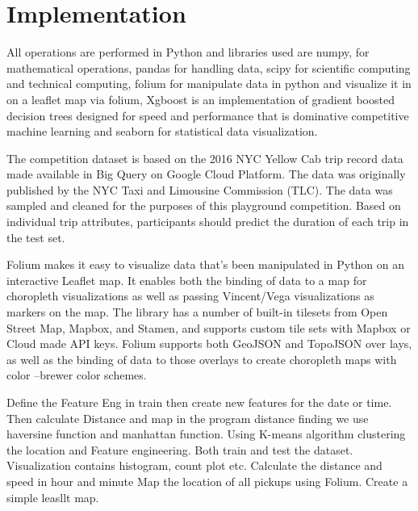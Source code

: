 \documentclass[12pt,report]{ucdavisthesis}
\begin{document}
             \section{Implementation}
        \hspace{2cm}All operations are performed in Python and libraries used are numpy, for
        mathematical operations, pandas for handling data, scipy for scientific computing
        and technical computing, folium for manipulate data in python and
        visualize it in on a leaflet map via folium, Xgboost is an implementation of
        gradient boosted decision trees designed for speed and performance that is
        dominative competitive machine learning and seaborn for statistical data
        visualization.\par\hspace{2cm} The competition dataset is based on the 2016 NYC Yellow Cab trip record
        data made available in Big Query on Google Cloud Platform. The data was
        originally published by the NYC Taxi and Limousine Commission (TLC). The
        data was sampled and cleaned for the purposes of this playground competition.
        Based on individual trip attributes, participants should predict the duration of
        each trip in the test set.
        \par\hspace{2cm}Folium makes it easy to visualize data that’s been manipulated in Python on an
        interactive Leaflet map. It enables both the binding of data to a map for
        choropleth visualizations as well as passing Vincent/Vega visualizations as
        markers on the map. The library has a number of built-in tilesets from Open Street
        Map, Mapbox, and Stamen, and supports custom tile sets with Mapbox or Cloud
        made API keys. Folium supports both GeoJSON and TopoJSON over lays, as
        well as the binding of data to those overlays to create choropleth maps with color
        –brewer color schemes.
        \par\hspace{2cm} Define the Feature Eng in train then create new features for the date or time. Then
        calculate Distance and map in the program distance finding we use haversine
        function and manhattan function. Using K-means algorithm clustering the
        location and Feature engineering. Both train and test the dataset. Visualization
        contains histogram, count plot etc. Calculate the distance and speed in hour and
        minute Map the location of all pickups using Folium. Create a simple leasllt map.
\end{document}
